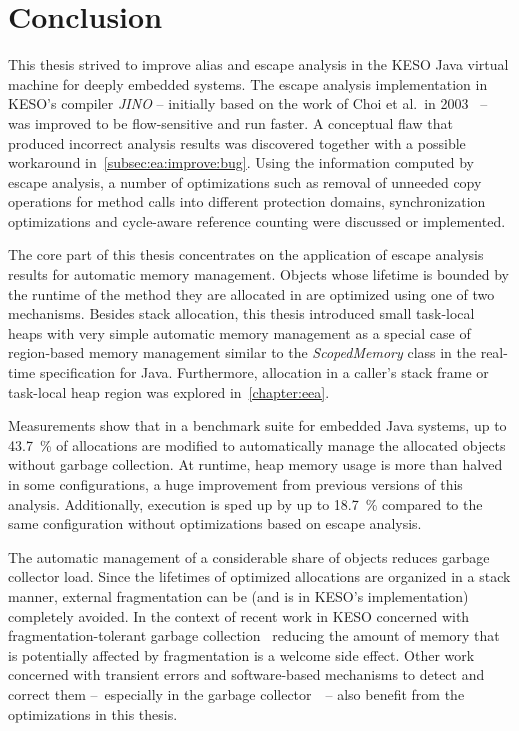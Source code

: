 
\chapter{Conclusion}
	\label{chapter:conclusion}
	This thesis strived to improve alias and escape analysis in the KESO Java virtual machine for deeply embedded systems.
	The escape analysis implementation in KESO's compiler \emph{JINO} – initially based on the work of Choi et al.\ in
	2003~\cite{choi:03:toplas} – was improved to be flow-sensitive and run faster. A conceptual flaw that produced
	incorrect analysis results was discovered together with a possible workaround in~\cref{subsec:ea:improve:bug}. Using
	the information computed by escape analysis, a number of optimizations such as removal of unneeded copy operations for
	method calls into different protection domains, synchronization optimizations and cycle-aware reference counting were
	discussed or implemented.

	The core part of this thesis concentrates on the application of escape analysis results for automatic memory
	management. Objects whose lifetime is bounded by the runtime of the method they are allocated in are optimized using
	one of two mechanisms. Besides stack allocation, this thesis introduced small task-local heaps with very simple
	automatic memory management as a special case of region-based memory management similar to the \emph{ScopedMemory}
	class in the real-time specification for Java. Furthermore, allocation in a caller's stack frame or task-local heap
	region was explored in~\cref{chapter:eea}.

	Measurements show that in a benchmark suite for embedded Java systems, up to 43.7~\% of allocations are modified to
	automatically manage the allocated objects without garbage collection. At runtime, heap memory usage is more than
	halved in some configurations, a huge improvement from previous versions of this analysis. Additionally, execution is
	sped up by up to 18.7~\% compared to the same configuration without optimizations based on escape analysis.

	The automatic management of a considerable share of objects reduces garbage collector load. Since the lifetimes of
	optimized allocations are organized in a stack manner, external fragmentation can be (and is in KESO's implementation)
	completely avoided. In the context of recent work in KESO concerned with fragmentation-tolerant garbage
	collection~\cite{strotz:14} reducing the amount of memory that is potentially affected by fragmentation is a welcome
	side effect. Other work concerned with transient errors and software-based mechanisms to detect and correct them
	–~especially in the garbage collector~\cite{taffner:14}~– also benefit from the optimizations in this thesis.

